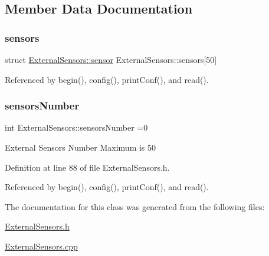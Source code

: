 \subsection{Member Data Documentation}
\mbox{\label{class_external_sensors_a284233f884fcf00154a44740cf1d9e1e}} 
\subsubsection{\texorpdfstring{sensors}{sensors}}
{\footnotesize\ttfamily struct \hyperlink{class_external_sensors_dd/d58/struct_external_sensors_1_1sensor}{External\+Sensors\+::sensor} External\+Sensors\+::sensors\mbox{[}50\mbox{]}\hspace{0.3cm}{\ttfamily [private]}}



Referenced by begin(), config(), print\+Conf(), and read().

\mbox{\label{class_external_sensors_a58e4fbf9adeae787d92be5fa33043b5d}} 
\subsubsection{\texorpdfstring{sensors\+Number}{sensorsNumber}}
{\footnotesize\ttfamily int External\+Sensors\+::sensors\+Number =0\hspace{0.3cm}{\ttfamily [private]}}

External Sensors Number Maximum is 50 

Definition at line 88 of file External\+Sensors.\+h.



Referenced by begin(), config(), print\+Conf(), and read().



The documentation for this class was generated from the following files\+:\begin{DoxyCompactItemize}
\item 
\hyperlink{_external_sensors_8h}{External\+Sensors.\+h}\item 
\hyperlink{_external_sensors_8cpp}{External\+Sensors.\+cpp}\end{DoxyCompactItemize}
